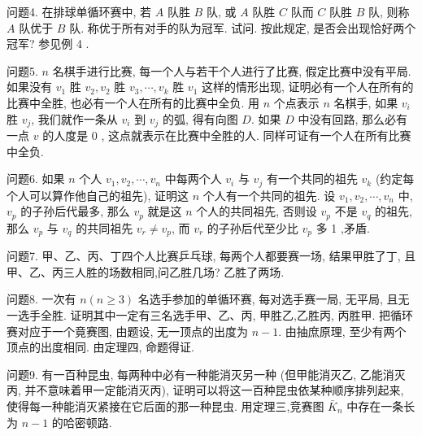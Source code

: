 问题4. 在排球单循环赛中, 若 $A$ 队胜 $B$ 队, 或 $A$ 队胜 $C$ 队而 $C$ 队胜 $B$ 队, 则称 $A$ 队优于 $B$ 队.
称优于所有对手的队为冠军.
试问.
按此规定, 是否会出现恰好两个冠军?
参见例 4 .



问题5. $n$ 名棋手进行比赛, 每一个人与若干个人进行了比赛, 假定比赛中没有平局.
如果没有 $v_1$ 胜 $v_2, v_2$ 胜 $v_3, \cdots, v_k$ 胜 $v_1$ 这样的情形出现, 证明必有一个人在所有的比赛中全胜, 也必有一个人在所有的比赛中全负.
用 $n$ 个点表示 $n$ 名棋手, 如果 $v_i$ 胜 $v_j$, 我们就作一条从 $v_i$ 到 $v_j$ 的弧, 得有向图 $D$. 如果 $D$ 中没有回路, 那么必有一点 $v$ 的人度是 0 , 这点就表示在比赛中全胜的人.
同样可证有一个人在所有比赛中全负.



问题6. 如果 $n$ 个人 $v_1, v_2, \cdots, v_n$ 中每两个人 $v_i$ 与 $v_j$ 有一个共同的祖先 $v_k$ (约定每个人可以算作他自己的祖先), 证明这 $n$ 个人有一个共同的祖先.
设 $v_1, v_2, \cdots, v_n$ 中, $v_p$ 的子孙后代最多, 那么 $v_p$ 就是这 $n$ 个人的共同祖先, 否则设 $v_p$ 不是 $v_q$ 的祖先, 那么 $v_p$ 与 $v_q$ 的共同祖先 $v_r \neq v_p$, 而 $v_r$ 的子孙后代至少比 $v_p$ 多 1 ,矛盾.



问题7. 甲、乙、丙、丁四个人比赛乒乓球, 每两个人都要赛一场, 结果甲胜了丁, 且甲、乙、丙三人胜的场数相同,问乙胜几场?
乙胜了两场.



问题8. 一次有 $n(n \geqslant 3)$ 名选手参加的单循环赛, 每对选手赛一局, 无平局, 且无一选手全胜.
证明其中一定有三名选手甲、乙、丙, 甲胜乙,乙胜丙, 丙胜甲.
把循环赛对应于一个竟赛图, 由题设, 无一顶点的出度为 $n-1$. 由抽庶原理, 至少有两个顶点的出度相同.
由定理四, 命题得证.



问题9. 有一百种昆虫, 每两种中必有一种能消灭另一种 (但甲能消灭乙, 乙能消灭丙, 并不意味着甲一定能消灭丙), 证明可以将这一百种昆虫依某种顺序排列起来, 使得每一种能消灭紧接在它后面的那一种昆虫.
用定理三,竞赛图 $\bar{K}_n$ 中存在一条长为 $n-1$ 的哈密顿路.


